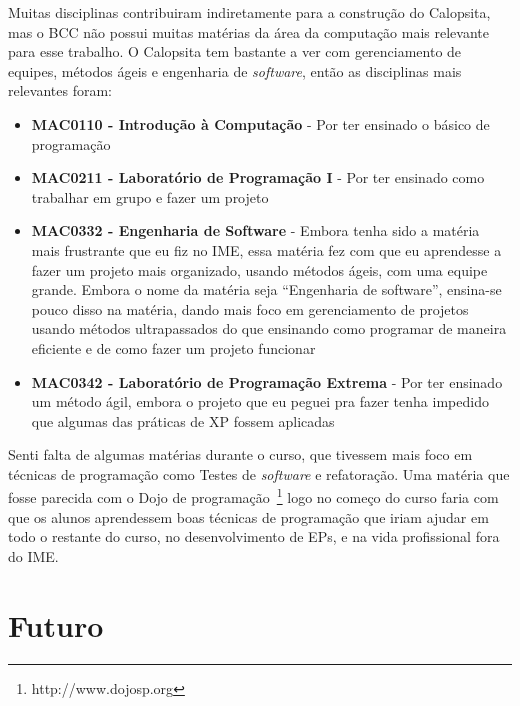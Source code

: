 \documentclass[titlepage,a4paper]{article}
\newcommand{\software}{\textit{software}}
\newcommand{\calopsita}{Calopsita}
\begin{document}
Muitas disciplinas contribuiram indiretamente para a construção do \calopsita{}, mas o BCC não possui muitas matérias da área da computação mais relevante para esse trabalho. O \calopsita{} tem bastante a ver com gerenciamento de equipes, métodos ágeis e engenharia de \software{}, então as disciplinas mais relevantes foram:

\begin{itemize}
	\item{\textbf{MAC0110 - Introdução à Computação} - Por ter ensinado o básico de programação}
	\item{\textbf{MAC0211 - Laboratório de Programação I} - Por ter ensinado como trabalhar em grupo e fazer um projeto}
	\item{\textbf{MAC0332 - Engenharia de Software} - Embora tenha sido a matéria mais frustrante que eu fiz no IME, essa matéria fez com que eu aprendesse a fazer um projeto mais organizado, usando métodos ágeis, com uma equipe grande. Embora o nome da matéria seja ``Engenharia de software'', ensina-se pouco disso na matéria, dando mais foco em gerenciamento de projetos usando métodos ultrapassados do que ensinando como programar de maneira eficiente e de como fazer um projeto funcionar}
	\item{\textbf{MAC0342 - Laboratório de Programação Extrema } - Por ter ensinado um método ágil, embora o projeto que eu peguei pra fazer tenha impedido que algumas das práticas de XP fossem aplicadas}
\end{itemize}

Senti falta de algumas matérias durante o curso, que tivessem mais foco em técnicas de programação como Testes de \software{} e refatoração. Uma matéria que fosse parecida com o Dojo de programação~\footnote{http://www.dojosp.org} logo no começo do curso faria com que os alunos aprendessem boas técnicas de programação que iriam ajudar em todo o restante do curso, no desenvolvimento de EPs, e na vida profissional fora do IME.

\section{Futuro}
\end{document}
